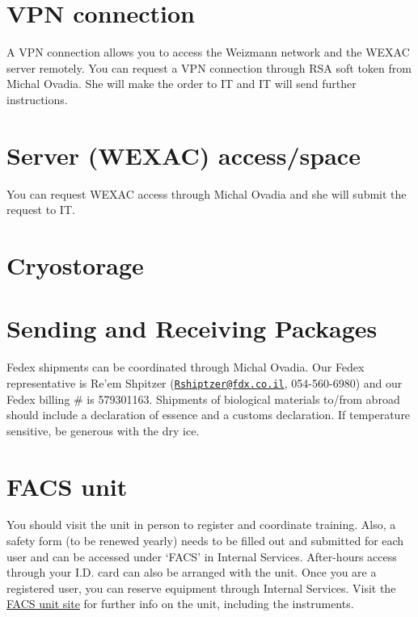 \documentclass[]{book}
\begin{document}
\section{VPN connection}\label{vpn-connection}

A VPN connection allows you to access the Weizmann network and the WEXAC
server remotely. You can request a VPN connection through RSA soft token
from Michal Ovadia. She will make the order to IT and IT will send
further instructions.

\section{Server (WEXAC) access/space}\label{server-wexac-accessspace}

You can request WEXAC access through Michal Ovadia and she will submit
the request to IT.

\section{Cryostorage}\label{cryostorage}

\section{Sending and Receiving
Packages}\label{sending-and-receiving-packages}

Fedex shipments can be coordinated through Michal Ovadia. Our Fedex
representative is Re'em Shpitzer
(\href{mailto:Rshiptzer@fdx.co.il}{\nolinkurl{Rshiptzer@fdx.co.il}},
054-560-6980) and our Fedex billing \# is 579301163. Shipments of
biological materials to/from abroad should include a declaration of
essence and a customs declaration. If temperature sensitive, be generous
with the dry ice.

\section{FACS unit}\label{facs-unit}

You should visit the unit in person to register and coordinate training.
Also, a safety form (to be renewed yearly) needs to be filled out and
submitted for each user and can be accessed under `FACS' in Internal
Services. After-hours access through your I.D. card can also be arranged
with the unit. Once you are a registered user, you can reserve equipment
through Internal Services. Visit the
\href{https://www.weizmann.ac.il/LS_CoreFacilities/flow-cytometry/about}{FACS
unit site} for further info on the unit, including the instruments.
\end{document}
